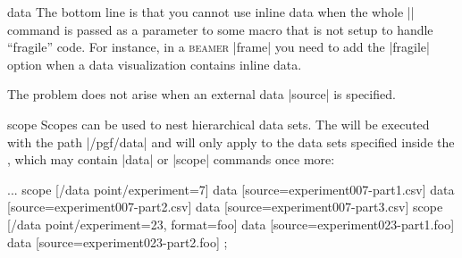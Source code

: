 \begin{datavisualizationoperation}{data}{}
  The bottom line is that you cannot use inline data when the whole
  |\datavisualization| command is passed as a parameter to some
  macro that is not setup to handle ``fragile'' code. For instance, in
  a \textsc{beamer} |frame| you need to add the |fragile| option when
  a data visualization contains inline data.

  The problem does not arise when an external data |source| is
  specified. 
\end{datavisualizationoperation}



\begin{datavisualizationoperation}{scope}{}
  Scopes can be used to nest hierarchical data sets. The
   will be executed with the path |/pgf/data| and will
  only apply to the data sets specified inside the , which may contain |data| or |scope| commands once more: 
\begin{codeexample}
\datavisualization...
  scope [/data point/experiment=7]
  {
    data [source=experiment007-part1.csv]
    data [source=experiment007-part2.csv]
    data [source=experiment007-part3.csv]
  }
  scope [/data point/experiment=23, format=foo]
  {
    data [source=experiment023-part1.foo]
    data [source=experiment023-part2.foo]
  };
\end{codeexample}
\end{datavisualizationoperation}


